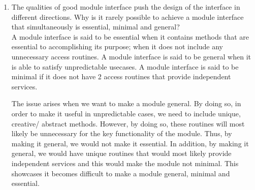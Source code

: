 \documentclass[12pt]{article}
\begin{document}
\begin{enumerate}
\item The qualities of good module interface push the design of the interface in
  different directions. Why is it rarely possible to achieve a module interface
  that simultaneously is essential, minimal and general?\\

  A module interface is said to be essential when it contains methods that are essential to accomplishing its purpose; when it 
  does not include any unnecessary access routines. A module interface is said to be general when it is able to satisfy
  unpredictable usecases. A module interface is said to be minimal if it does not have 2 access routines that provide independent
  services.
  
  The issue arises when we want to make a module general. By doing so, in order to make it useful in unpredictable cases, we need to
  include unique, creative/ abstract methods. However, by doing so, these routines will most likely be unnecessary for the key functionality
  of the module. Thus, by making it general, we would not make it essential. In addition, by making it general, we would have unique routines
  that would most likely provide independent services and this would make the module not minimal. This showcases it becomes difficult to make a
  module general, minimal and essential.

\end{enumerate}
\end{document}
